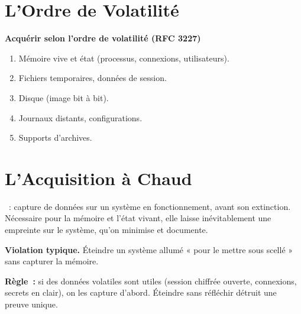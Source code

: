 \separateur

\section{L'Ordre de Volatilité}
\label{sec:c09-volatilite}

\begin{boxprocedure}
\textbf{Acquérir selon l'ordre de volatilité (RFC 3227)}
\begin{enumerate}
    \item Mémoire vive et état (processus, connexions, utilisateurs).
    \item Fichiers temporaires, données de session.
    \item Disque (image bit à bit).
    \item Journaux distants, configurations.
    \item Supports d'archives.
\end{enumerate}
\end{boxprocedure}

\section{L'Acquisition à Chaud}
\label{sec:c09-chaud}

\begin{boxdef}
~: capture de données sur un système en
fonctionnement, avant son extinction. Nécessaire pour la mémoire et l'état
vivant, elle laisse inévitablement une empreinte sur le système, qu'on
minimise et documente.
\end{boxdef}

\begin{boxalert}
\textbf{Violation typique.} Éteindre un système allumé « pour le mettre sous
scellé » sans capturer la mémoire.

\smallskip
\textbf{Règle~:} si des données volatiles sont utiles (session chiffrée
ouverte, connexions, secrets en clair), on les capture d'abord. Éteindre sans
réfléchir détruit une preuve unique.
\end{boxalert}

